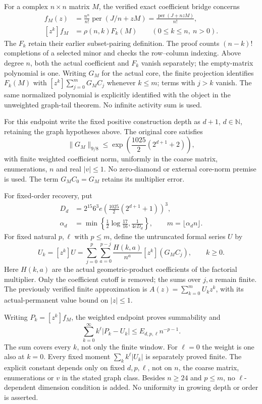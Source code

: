 \documentclass[11pt]{article}
\begin{document}
For a complex $n\times n$ matrix $M$, the verified exact coefficient bridge concerns
\[
 \begin{aligned}
 f_M(z)&=\frac{n^n}{n!}\operatorname{per}(J/n+zM)
       =\frac{\operatorname{per}(J+nzM)}{n!},\\
 [z^k]f_M&=\rho(n,k)F_k(M)\qquad(0\le k\le n,\ n>0).
 \end{aligned}
\]
The $F_k$ retain their earlier subset-pairing definition. The proof counts $(n-k)!$ completions of a selected minor and checks the row--column indexing. Above degree $n$, both the actual coefficient and $F_k$ vanish separately; the empty-matrix polynomial is one. Writing $G_M$ for the actual core, the finite projection identifies $F_k(M)$ with $[z^k]\sum_{j=0}^{m}G_MC_j$ whenever $k\le m$; terms with $j>k$ vanish. The same normalized polynomial is explicitly identified with the object in the unweighted graph-tail theorem. No infinite activity sum is used.

For this endpoint write the fixed positive construction depth as $d+1$, $d\in\mathbb N$, retaining the graph hypotheses above. The original core satisfies
\[
 \|G_M\|_{9/8}\le\exp\!\left(\frac{1025}{2}(2^{d+1}+2)\right),
\]
with finite weighted coefficient norm, uniformly in the coarse matrix, enumerations, $n$ and real $|v|\le1$. No zero-diamond or external core-norm premise is used. The term $G_MC_0=G_M$ retains its multiplier error.

For fixed-order recovery, put
\[
 \begin{aligned}
 D_d&=2^{15}6^3e\left(\frac{1025}{2}(2^{d+1}+1)\right)^3,\\
 \alpha_d&=\min\!\left\{\frac12\log\frac{17}{16},\frac1{4eD_d}\right\},
 \qquad m=\lfloor\alpha_dn\rfloor.
 \end{aligned}
\]
For fixed natural $p,\ell$ with $p\le m$, define the untruncated formal series $U$ by
\[
 U_k=[z^k]U=\sum_{j=0}^{p}\sum_{a=0}^{p-j}
 \frac{H(k,a)}{n^a}[z^k](G_MC_j),\qquad k\ge0.
\]
Here $H(k,a)$ are the actual geometric-product coefficients of the factorial multiplier. Only the coefficient cutoff is removed; the sums over $j,a$ remain finite. The previously verified finite approximation is $A(z)=\sum_{k=0}^{m}U_kz^k$, with its actual-permanent value bound on $|z|\le1$.

Writing $P_k=[z^k]f_M$, the weighted endpoint proves summability and
\[
 \sum_{k=0}^{\infty}k^\ell\lvert P_k-U_k\rvert
 \le E_{d,p,\ell}n^{-p-1}.
\]
The sum covers every $k$, not only the finite window. For $\ell=0$ the weight is one also at $k=0$. Every fixed moment $\sum_k k^\ell|U_k|$ is separately proved finite. The explicit constant depends only on fixed $d,p,\ell$, not on $n$, the coarse matrix, enumerations or $v$ in the stated graph class. Besides $n\ge24$ and $p\le m$, no $\ell$-dependent dimension condition is added. No uniformity in growing depth or order is asserted.
\end{document}
